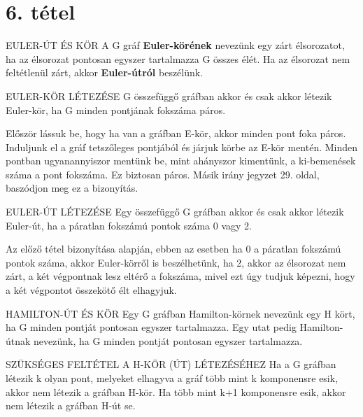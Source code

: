 \section{6. tétel}

\begin{definicio}{EULER-ÚT ÉS KÖR}
A G gráf \textbf{Euler-körének} nevezünk egy zárt élsorozatot, ha az élsorozat pontosan egyszer tartalmazza G összes élét. Ha az élsorozat nem feltétlenül zárt, akkor \textbf{Euler-útról} beszélünk.
\end{definicio}

\begin{tetel}{EULER-KÖR LÉTEZÉSE}
G összefüggő gráfban akkor és csak akkor létezik Euler-kör, ha G minden pontjának fokszáma páros.
\end{tetel}

\begin{bizonyitas}{}
Először lássuk be, hogy ha van a gráfban E-kör, akkor minden pont foka páros. Induljunk el a gráf tetszőleges pontjából és járjuk körbe az E-kör mentén. Minden pontban ugyanannyiszor mentünk be, mint ahányszor kimentünk, a ki-bemenések száma a pont fokszáma. Ez biztosan páros. Másik irány jegyzet 29. oldal, baszódjon meg ez a bizonyítás.
\end{bizonyitas}

\begin{tetel}{EULER-ÚT LÉTEZÉSE}
Egy összefüggő G gráfban akkor és csak akkor létezik Euler-út, ha a páratlan fokszámú pontok száma 0 vagy 2.
\end{tetel}

\begin{bizonyitas}{}
Az előző tétel bizonyítása alapján, ebben az esetben ha 0 a páratlan fokszámú pontok száma, akkor Euler-körről is beszélhetünk, ha 2, akkor az élsorozat nem zárt, a két végpontnak lesz eltérő a fokszáma, mivel ezt úgy tudjuk képezni, hogy a két végpontot összekötő élt elhagyjuk.
\end{bizonyitas}

\begin{definicio}{HAMILTON-ÚT ÉS KÖR}
Egy G gráfban Hamilton-körnek nevezünk egy H kört, ha G minden pontját pontosan egyszer tartalmazza. Egy utat pedig Hamilton-útnak nevezünk, ha G minden pontját pontosan egyszer tartalmazza.
\end{definicio}

\begin{tetel}{SZÜKSÉGES FELTÉTEL A H-KÖR (ÚT) LÉTEZÉSÉHEZ}
Ha a G gráfban létezik k olyan pont, melyeket elhagyva a gráf több mint k komponensre esik, akkor nem létezik a gráfban H-kör. Ha több mint k+1 komponensre esik, akkor nem létezik a gráfban H-út se.
\end{tetel}

